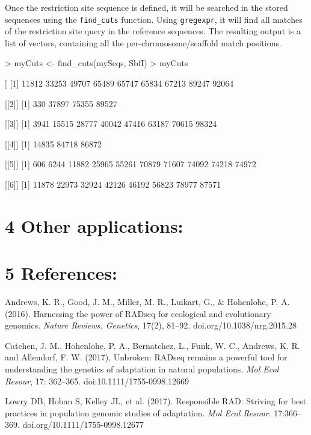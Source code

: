 \documentclass{article}
\begin{document}
Once the restriction site sequence is defined, it will be searched in the stored sequences using the \texttt{find\_cuts} function. Using \texttt{gregexpr}, it will find all matches of the restriction site query in the reference sequences. The resulting output is a list of vectors, containing all the per-chromosome/scaffold match positions.
\begin{Schunk}
\begin{Sinput}
> myCuts <- find_cuts(mySeqs, SbfI)
> myCuts
\end{Sinput}
\begin{Soutput}
[[1]]
[1] 11812 33253 49707 65489 65747 65834 67213 89247 92064

[[2]]
[1]   330 37897 75355 89527

[[3]]
[1]  3941 15515 28777 40042 47416 63187 70615 98324

[[4]]
[1] 14835 84718 86872

[[5]]
 [1]   606  6244 11882 25965 55261 70879 71607 74092 74218 74972

[[6]]
[1] 11878 22973 32924 42126 46192 56823 78977 87571
\end{Soutput}
\end{Schunk}


\subsection*{}
\section*{4 Other applications:}
\section*{5 References:}


Andrews, K. R., Good, J. M., Miller, M. R., Luikart, G., \& Hohenlohe, P. A. (2016). Harnessing the power of RADseq for ecological and evolutionary genomics. \emph{Nature Reviews. Genetics}, 17(2), 81–92. doi.org/10.1038/nrg.2015.28

Catchen, J. M., Hohenlohe, P. A., Bernatchez, L., Funk, W. C., Andrews, K. R. and Allendorf, F. W. (2017), Unbroken: RADseq remains a powerful tool for understanding the genetics of adaptation in natural populations. \emph{Mol Ecol Resour}, 17: 362–365. doi:10.1111/1755-0998.12669

Lowry DB, Hoban S, Kelley JL, et al. (2017). Responsible RAD: Striving for best practices in population genomic studies of adaptation. \emph{Mol Ecol Resour}. 17:366–369. doi.org/10.1111/1755-0998.12677
\end{document}
